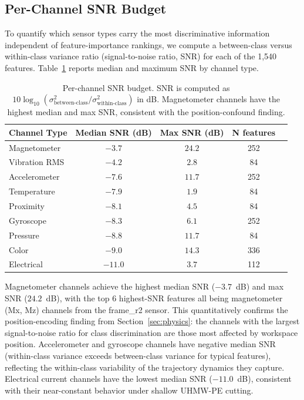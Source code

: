 \subsection{Per-Channel SNR Budget}

To quantify which sensor types carry the most discriminative information independent of feature-importance rankings, we compute a between-class versus within-class variance ratio (signal-to-noise ratio, SNR) for each of the 1{,}540 features. Table~\ref{tab:snr_budget} reports median and maximum SNR by channel type.

\begin{table}[H]
\caption{Per-channel SNR budget. SNR is computed as $10\log_{10}(\sigma^2_{\text{between-class}} / \sigma^2_{\text{within-class}})$ in dB. Magnetometer channels have the highest median and max SNR, consistent with the position-confound finding.}\label{tab:snr_budget}
\centering
\begin{tabular}{lcccc}
\toprule
\textbf{Channel Type} & \textbf{Median SNR (dB)} & \textbf{Max SNR (dB)} & \textbf{N features} \\
\midrule
Magnetometer    & $-3.7$  & $24.2$ & 252 \\
Vibration RMS   & $-4.2$  & $2.8$  & 84 \\
Accelerometer   & $-7.6$  & $11.7$ & 252 \\
Temperature     & $-7.9$  & $1.9$  & 84 \\
Proximity       & $-8.1$  & $4.5$  & 84 \\
Gyroscope       & $-8.3$  & $6.1$  & 252 \\
Pressure        & $-8.8$  & $11.7$ & 84 \\
Color           & $-9.0$  & $14.3$ & 336 \\
Electrical      & $-11.0$ & $3.7$  & 112 \\
\bottomrule
\end{tabular}
\end{table}

Magnetometer channels achieve the highest median SNR ($-3.7$~dB) and max SNR ($24.2$~dB), with the top 6 highest-SNR features all being magnetometer (Mx, Mz) channels from the frame\_r2 sensor. This quantitatively confirms the position-encoding finding from Section~\ref{sec:physics}: the channels with the largest signal-to-noise ratio for class discrimination are those most affected by workspace position. Accelerometer and gyroscope channels have negative median SNR (within-class variance exceeds between-class variance for typical features), reflecting the within-class variability of the trajectory dynamics they capture. Electrical current channels have the lowest median SNR ($-11.0$~dB), consistent with their near-constant behavior under shallow UHMW-PE cutting.

